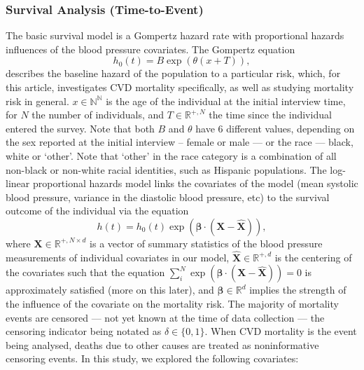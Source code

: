 \documentclass[
]{article}
\begin{document}
\hypertarget{survival-analysis-time-to-event}{%
\subsubsection{Survival Analysis (Time-to-Event)}\label{survival-analysis-time-to-event}}

The basic survival model is a Gompertz hazard rate with proportional hazards influences of the blood pressure covariates.
The Gompertz equation
\begin{equation}\label{gompertz}
h_0(t)=B\exp{\left(\theta(x+T)\right)},
\end{equation}
describes the baseline hazard of the population to a particular risk, which, for this article, investigates CVD mortality specifically, as well as studying mortality risk in general. \(x\in\mathbb{N^N}\) is the age of the individual at the initial interview time, for \(N\) the number of individuals, and \(T\in\mathbb{R}^{+,N}\) the time since the individual entered the survey.
Note that both \(B\) and \(\theta\) have 6 different values, depending on the sex reported at the initial interview -- female or male --- or the race --- black, white or `other'.
Note that `other' in the race category is a combination of all non-black or non-white racial identities, such as Hispanic populations.
The log-linear proportional hazards model links the covariates of the model (mean systolic blood pressure, variance in the diastolic blood pressure, etc) to the survival outcome of the individual via the equation
\begin{equation}\label{prophaz}
h(t)=h_0(t)\exp{\left(\boldsymbol{\beta}\cdot(\boldsymbol{X}-\hat{\boldsymbol{X}})\right)},
\end{equation}
where \(\boldsymbol{X}\in\mathbb{R}^{+,N\times d}\) is a vector of summary statistics of the blood pressure measurements of individual covariates in our model, \(\hat{\boldsymbol{X}}\in\mathbb{R}^{+,d}\) is the centering of the covariates such that the equation \(\sum_i^N \exp{(\boldsymbol{\beta}\cdot(\boldsymbol{X}-\hat{\boldsymbol{X}}))}=0\) is approximately satisfied (more on this later), and \(\boldsymbol{\beta}\in\mathbb{R}^d\) implies the strength of the influence of the covariate on the mortality risk.
The majority of mortality events are censored --- not yet known at the time of data collection --- the censoring indicator being notated as \(\delta\in \{0,1\}\).
When CVD mortality is the event being analysed, deaths due to other causes are treated as noninformative censoring events.
In this study, we explored the following covariates:
\end{document}
